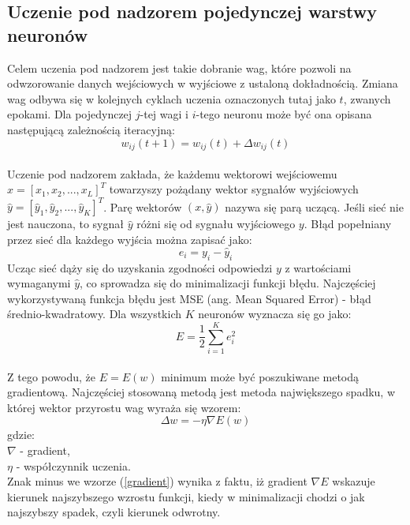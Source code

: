 \documentclass[a4paper, openright, twoside,11pt]{article}
\begin{document}
    \subsection{Uczenie pod nadzorem pojedynczej warstwy neuronów}
    Celem uczenia pod nadzorem jest takie dobranie wag, które pozwoli na odwzorowanie danych wejściowych w wyjściowe z ustaloną dokładnością. Zmiana wag odbywa się w kolejnych cyklach uczenia oznaczonych tutaj jako $t$, zwanych epokami. Dla pojedynczej $j$-tej wagi i $i$-tego neuronu może być ona opisana następującą zależnością iteracyjną:
    \begin{equation} \label{zmiana_wag}
    w_{ij}(t+1) = w_{ij}(t) + \Delta w_{ij}(t)
    \end{equation}\\
    Uczenie pod nadzorem zakłada, że każdemu wektorowi wejściowemu $x = [x_1,x_2,...,x_L]^T$ towarzyszy pożądany wektor sygnałów wyjściowych $\hat{y} = [\hat{y}_1,\hat{y}_2,...,\hat{y}_K]^T$. Parę wektorów $(x,\hat{y})$ nazywa się parą uczącą. Jeśli sieć nie jest nauczona, to sygnał $\hat{y}$ różni się od sygnału wyjściowego $y$. Błąd popełniany przez sieć dla każdego wyjścia można zapisać jako:
    \begin{equation} \label{error}
    e_i = y_i - \hat{y}_i
    \end{equation}
    Ucząc sieć dąży się do uzyskania zgodności odpowiedzi $y$ z wartościami wymaganymi $\hat{y}$, co sprowadza się do minimalizacji funkcji błędu. Najczęściej wykorzystywaną funkcja błędu jest MSE (ang. Mean Squared Error) - błąd średnio-kwadratowy. Dla wszystkich $K$ neuronów wyznacza się go jako:
    \begin{equation} \label{error2}
    E = \frac{1}{2} \sum^K_{i=1} e^2_i
    \end{equation}\\
    Z tego powodu, że $E=E(w)$ minimum może być poszukiwane metodą gradientową. Najczęściej stosowaną metodą jest metoda największego spadku, w której wektor przyrostu wag wyraża się wzorem:
    \begin{equation} \label{gradient}
    \Delta  w = - \eta \nabla E(w)
    \end{equation}
    gdzie:\\[0.3cm]
    $\nabla$ - gradient,\\[0.1cm]
    $\eta$ - współczynnik uczenia.\\[0.3cm]
    Znak minus we wzorze (\ref{gradient}) wynika z faktu, iż gradient $\nabla E$ wskazuje kierunek najszybszego wzrostu funkcji, kiedy w minimalizacji chodzi o jak najszybszy spadek, czyli kierunek odwrotny.\\
\end{document}
